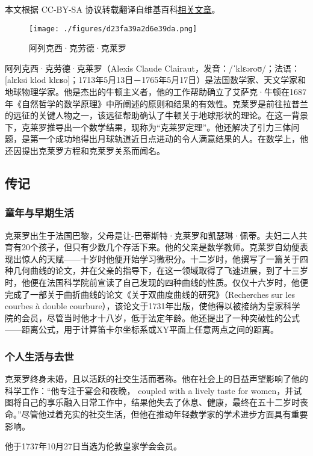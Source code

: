 
本文根据 CC-BY-SA 协议转载翻译自维基百科\href{https://en.wikipedia.org/wiki/Alexis_Clairaut}{相关文章}。
\begin{figure}[ht]
\centering
\texttt{[image: ./figures/d23fa39a2d6e39da.png]}
\caption{阿列克西·克劳德·克莱罗} \label{fig_Alexis_1}
\end{figure}
阿列克西·克劳德·克莱罗（Alexis Claude Clairaut，发音：/ˈklɛəroʊ/；法语：[alɛksi klod klɛʁo]；1713年5月13日－1765年5月17日）是法国数学家、天文学家和地球物理学家。他是杰出的牛顿主义者，他的工作帮助确立了艾萨克·牛顿在1687年《自然哲学的数学原理》中所阐述的原则和结果的有效性。克莱罗是前往拉普兰的远征的关键人物之一，该远征帮助确认了牛顿关于地球形状的理论。在这一背景下，克莱罗推导出一个数学结果，现称为“克莱罗定理”。他还解决了引力三体问题，是第一个成功地得出月球轨道近日点进动的令人满意结果的人。在数学上，他还因提出克莱罗方程和克莱罗关系而闻名。
\subsection{传记}  
\subsubsection{童年与早期生活}  
克莱罗出生于法国巴黎，父母是让-巴蒂斯特·克莱罗和凯瑟琳·佩蒂。夫妇二人共育有20个孩子，但只有少数几个存活下来。他的父亲是数学教师。克莱罗自幼便表现出惊人的天赋——十岁时他便开始学习微积分。十二岁时，他撰写了一篇关于四种几何曲线的论文，并在父亲的指导下，在这一领域取得了飞速进展，到了十三岁时，他便在法国科学院前宣读了自己发现的四种曲线的性质。仅仅十六岁时，他便完成了一部关于曲折曲线的论文《关于双曲度曲线的研究》（Recherches sur les courbes à double courbure），该论文于1731年出版，使他得以被接纳为皇家科学院的会员，尽管当时他才十八岁，低于法定年龄。他还提出了一种突破性的公式——距离公式，用于计算笛卡尔坐标系或XY平面上任意两点之间的距离。
\subsubsection{个人生活与去世}  
克莱罗终身未婚，且以活跃的社交生活而著称。他在社会上的日益声望影响了他的科学工作：“他专注于宴会和夜晚， coupled with a lively taste for women，并试图将自己的享乐融入日常工作中，结果他失去了休息、健康，最终在五十二岁时丧命。”尽管他过着充实的社交生活，但他在推动年轻数学家的学术进步方面具有重要影响。

他于1737年10月27日当选为伦敦皇家学会会员。

